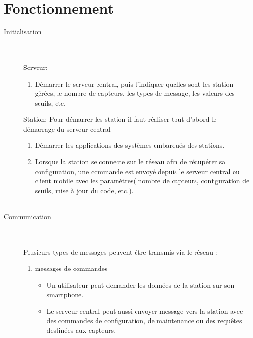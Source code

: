 \documentclass [a4paper] {report}
\begin{document}
\section{Fonctionnement}

\begin{description}

\item[Initialisation]\hfill\\
	\\Serveur:
	\begin{enumerate}
	\item Démarrer le serveur central, puis l'indiquer quelles sont les station gérées, le nombre de capteurs, les types de message, les valeurs des seuils, etc.\\
	\end{enumerate}
	Station: 
	Pour démarrer les station il faut réaliser tout d'abord le démarrage du serveur central
	\begin{enumerate}
	\item Démarrer les applications des systèmes embarqués des stations.
	\item Lorsque la station se connecte sur le réseau afin de récupérer sa configuration, une commande est envoyé 
	depuis le serveur central ou client mobile avec les paramètres( nombre de capteurs, configuration de seuils, mise à jour du code, etc.).\\\\
	\end{enumerate}

\item [Communication]\hfill\\
	\\Plusieurs types de messages peuvent être transmis via le réseau :\\
	\begin{enumerate}
	\item messages de commandes \\
		\begin{itemize}
		\item Un utilisateur peut demander les données de la station sur son smartphone.\\
		\item Le serveur central peut aussi envoyer message vers la station avec des commandes 
		de configuration, de maintenance ou des requêtes destinées aux capteurs.\\
		\end{itemize}
	

\end{enumerate}
\end{description}
\end{document}
